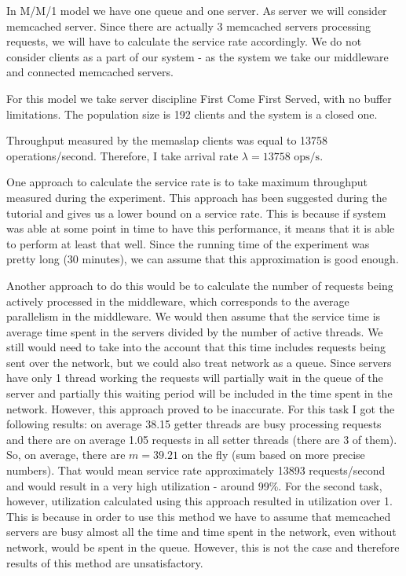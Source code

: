 \documentclass[11pt]{article}
\begin{document}
In M/M/1 model we have one queue and one server. As server we will consider memcached server. Since there are actually 3 memcached servers processing requests, we will have to calculate the service rate accordingly. We do not consider clients as a part of our system - as the system we take our middleware and connected memcached servers.

For this model we take server discipline First Come First Served, with no buffer limitations. The population size is 192 clients and the system is a closed one.

Throughput measured by the memaslap clients was equal to 13758 operations/second. Therefore, I take arrival rate $\lambda = 13758 \textrm{ ops/s}$.

One approach to calculate the service rate is to take maximum throughput measured during the experiment. This approach has been suggested during the tutorial and gives us a lower bound on a service rate. This is because if system was able at some point in time to have this performance, it means that it is able to perform at least that well. Since the running time of the experiment was pretty long (30 minutes), we can assume that this approximation is good enough.

Another approach to do this would be to calculate the number of requests being actively processed in the middleware, which corresponds to the average parallelism in the middleware. We would then assume that the service time is average time spent in the servers divided by the number of active threads. We still would need to take into the account that this time includes requests being sent over the network, but we could also treat network as a queue. Since servers have only 1 thread working the requests will partially wait in the queue of the server and partially this waiting period will be included in the time spent in the network. However, this approach proved to be inaccurate. For this task I got the following results: on average 38.15 getter threads are busy processing requests and there are on average 1.05 requests in all setter threads (there are 3 of them). So, on average, there are $m = 39.21$ on the fly (sum based on more precise numbers). That would mean service rate approximately 13893 requests/second and would result in a very high utilization - around 99\%. For the second task, however, utilization calculated using this approach resulted in utilization over 1. This is because in order to use this method we have to assume that memcached servers are busy almost all the time and time spent in the network, even without network, would be spent in the queue. However, this is not the case and therefore results of this method are unsatisfactory. 
\end{document}
